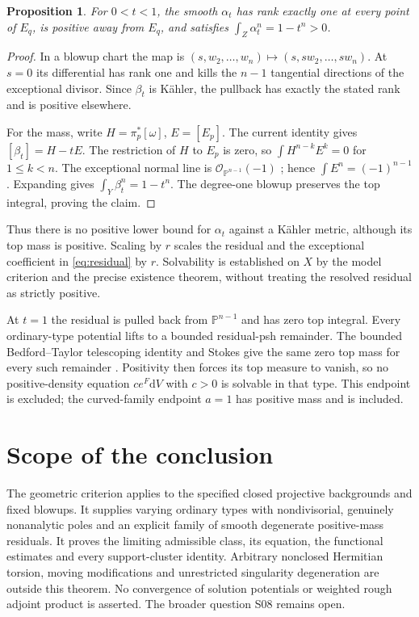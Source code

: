 \documentclass[11pt]{article}
\newtheorem{proposition}[theorem]{Proposition}
\newcommand{\CP}{\mathbb P}
\begin{document}
\begin{proposition}
For $0<t<1$, the smooth $\alpha_t$ has rank exactly one at every point
of $E_q$, is positive away from $E_q$, and satisfies
$\int_Z\alpha_t^n=1-t^n>0$.
\end{proposition}
\begin{proof}
In a blowup chart the map is
$(s,w_2,\ldots,w_n)\mapsto(s,sw_2,\ldots,sw_n)$.
At $s=0$ its differential has rank one and kills the $n-1$ tangential
directions of the exceptional divisor. Since $\beta_t$ is K\"ahler,
the pullback has exactly the stated rank and is positive elsewhere.

For the mass, write $H=\pi_p^*[\omega]$, $E=[E_p]$.
The current identity gives $[\beta_t]=H-tE$. The restriction of $H$
to $E_p$ is zero, so $\int H^{n-k}E^k=0$ for $1\le k<n$.
The exceptional normal line is $\mathcal O_{\CP^{n-1}}(-1)$
\cite[VII.12.4]{Demailly}; hence $\int E^n=(-1)^{n-1}$.
Expanding gives $\int_Y\beta_t^n=1-t^n$.
The degree-one blowup preserves the top integral, proving the claim.
\end{proof}

Thus there is no positive lower bound for $\alpha_t$ against a K\"ahler
metric, although its top mass is positive. Scaling by $r$ scales the
residual and the exceptional coefficient in \eqref{eq:residual} by $r$.
Solvability is established on $X$ by the model criterion and the precise
existence theorem, without treating the resolved residual as strictly positive.

At $t=1$ the residual is pulled back from $\CP^{n-1}$ and has zero top
integral. Every ordinary-type potential lifts to a bounded residual-psh
remainder. The bounded Bedford--Taylor telescoping identity and Stokes
give the same zero top mass for every such remainder
\cite[Theorem 1.14, with the exceptional set empty]{BEGZ}. Positivity then
forces its top measure to vanish, so no positive-density equation
$c e^F\mathrm dV$ with $c>0$ is solvable in that type. This endpoint is
excluded; the curved-family endpoint $a=1$ has positive mass and is included.

\section{Scope of the conclusion}

The geometric criterion applies to the specified closed projective
backgrounds and fixed blowups. It supplies varying ordinary types with
nondivisorial, genuinely nonanalytic poles and an explicit family of
smooth degenerate positive-mass residuals. It proves the limiting
admissible class, its equation, the functional estimates and every
support-cluster identity. Arbitrary nonclosed Hermitian torsion, moving
modifications and unrestricted singularity degeneration are outside
this theorem. No convergence of solution potentials or weighted rough
adjoint product is asserted. The broader question S08 remains open.
\end{document}
